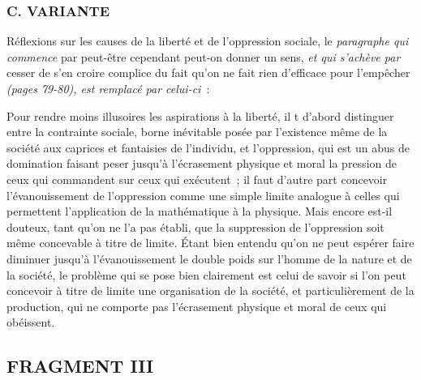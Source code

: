 \documentclass[french,twoside]{book} %
\begin{document}
\subsubsection[C. VARIANTE]{C. VARIANTE}
 Réflexions sur les causes de la liberté et de l'oppression sociale, le {\itshape paragraphe qui commence} par peut-être cependant peut-on donner un sens, {\itshape et qui s'achève par} cesser de s'en croire complice du fait qu'on ne fait rien d'efficace pour l'empêcher {\itshape (pages 79-80), est remplacé par celui-ci} :\par
Pour rendre moins illusoires les aspirations à la liberté, il t d'abord distinguer entre la contrainte sociale, borne inévitable posée par l'existence même de la société aux caprices et fantaisies de l'individu, et l'oppression, qui est un abus de domination faisant peser jusqu'à l'écrasement physique et moral la pression de ceux qui commandent sur ceux qui exécutent ; il faut d'autre part concevoir l'évanouissement de l'oppression comme une simple limite analogue à celles qui permettent l'application de la mathématique à la physique. Mais encore est-il douteux, tant qu'on ne l'a pas établi, que la suppression de l'oppression soit même concevable à titre de limite. Étant bien entendu qu'on ne peut espérer faire diminuer jusqu'à l'évanouissement le double poids sur l'homme de la nature et de la société, le problème qui se pose bien clairement est celui de savoir si l'on peut concevoir à titre de limite une organisation de la société, et particulièrement de la production, qui ne comporte pas l'écrasement physique et moral de ceux qui obéissent.
\subsection[FRAGMENT III]{FRAGMENT III}
\end{document}
